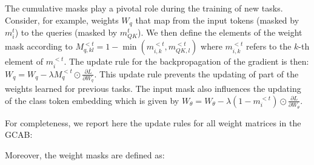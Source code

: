 \documentclass[twocolumn]{svjour3}          %
\begin{document}
The cumulative masks play a pivotal role during the training of new tasks. Consider, for example, weights $W_q$ that map from the input tokens (masked by $m_i^t$) to the queries (masked by $m_{QK}^t$). We then define the elements of the weight mask according to $M^{<t}_{q,kl}=1-\min(m_{i,k}^{<t},m_{QK,l}^{<t})$ where $m_{i,k}^{<t}$ refers to the $k$-th element of $m_{i}^{<t}$. The update rule for the backpropagation of the gradient is then: $ W_{q} = W_{q} - \lambda M_{q}^{< t} \odot \frac{\partial L}{\partial W_{q}}$. This update rule prevents the updating of part of the weights learned for previous tasks. The input mask also influences the updating of the class token embedding which is given by $W_\theta =W_\theta-\lambda (1-m_{i}^{<t}) \odot \frac{\partial L}{\partial W_{\theta}}$. 

For completeness, we report here the update rules for all weight matrices in the GCAB:
\begin{center}
\end{center}
Moreover, the weight masks are defined as:
\begin{center}
\end{center}
\end{document}

